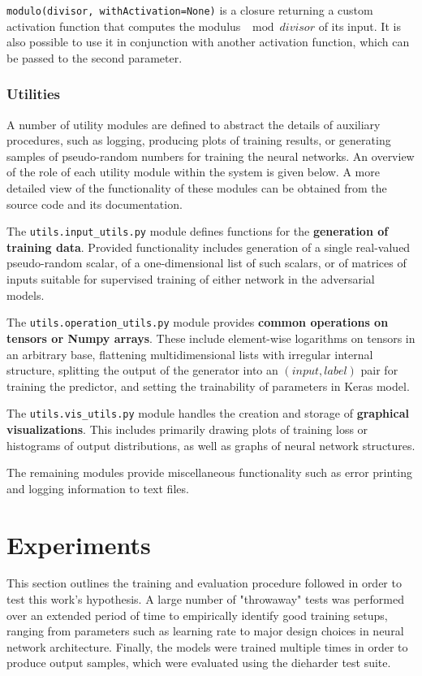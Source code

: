 \documentclass[12pt, titlepage]{report}
\theoremstyle{definition}
\begin{document}
\texttt{modulo(divisor, withActivation=None)} is a closure returning a custom activation function that computes the modulus $\mod{divisor}$ of its input. It is also possible to use it in conjunction with another activation function, which can be passed to the second parameter.


\subsection{Utilities}
A number of utility modules are defined to abstract the details of auxiliary procedures, such as logging, producing plots of training results, or generating samples of pseudo-random numbers for training the neural networks. An overview of the role of each utility module within the system is given below. A more detailed view of the functionality of these modules can be obtained from the source code and its documentation.

The \texttt{utils.input_utils.py} module defines functions for the \textbf{generation of training data}. Provided functionality includes generation of a single real-valued pseudo-random scalar, of a one-dimensional list of such scalars, or of matrices of inputs suitable for supervised training of either network in the adversarial models.

The \texttt{utils.operation_utils.py} module provides \textbf{common operations on tensors or Numpy arrays}. These include element-wise logarithms on tensors in an arbitrary base, flattening multidimensional lists with irregular internal structure, splitting the output of the generator into an $(input, label)$ pair for training the predictor, and setting the trainability of parameters in Keras model.

The \texttt{utils.vis_utils.py} module handles the creation and storage of \textbf{graphical visualizations}. This includes primarily drawing plots of training loss or histograms of output distributions, as well as graphs of neural network structures.

The remaining modules provide miscellaneous functionality such as error printing and logging information to text files.


\chapter{Experiments}\label{chapter:experiments}
This section outlines the training and evaluation procedure followed in order to test this work's hypothesis. A large number of "throwaway" tests was performed over an extended period of time to empirically identify good training setups, ranging from parameters such as learning rate to major design choices in neural network architecture. Finally, the models were trained multiple times in order to produce output samples, which were evaluated using the dieharder test suite.
\end{document}
